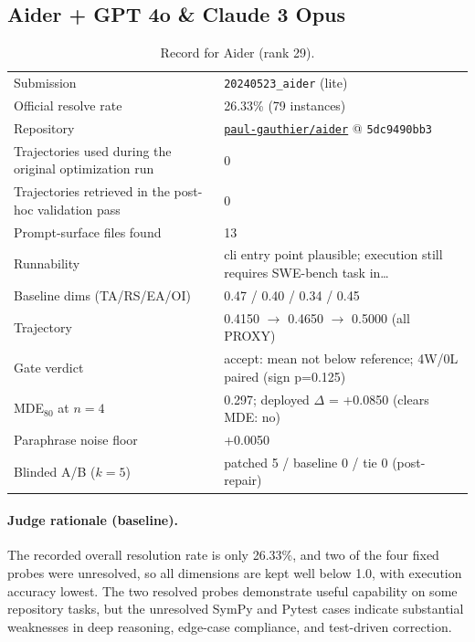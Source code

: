 \subsection{Aider + GPT 4o \& Claude 3 Opus}
\label{app:agent29}
\begin{table}[H]\centering\scriptsize
\caption{Record for Aider (rank 29).}
\begin{tabular}{lp{8.2cm}}\toprule
Submission & \texttt{20240523\_\allowbreak{}aider} (lite) \\
Official resolve rate & 26.33\% (79 instances) \\
Repository & \href{https://github.com/paul-gauthier/aider}{\texttt{paul-gauthier/aider}} @ \texttt{5dc9490bb3} \\
Trajectories used during the original optimization run & 0 \\
Trajectories retrieved in the post-hoc validation pass & 0 \\
Prompt-surface files found & 13 \\
Runnability & cli entry point plausible; execution still requires SWE-bench task in\ldots{} \\
Baseline dims (TA/RS/EA/OI) & 0.47 / 0.40 / 0.34 / 0.45 \\
Trajectory & 0.4150 $\to$ 0.4650 $\to$ 0.5000 (all PROXY) \\
Gate verdict & accept: mean not below reference; 4W/0L paired (sign p=0.125) \\
MDE$_{80}$ at $n{=}4$ & 0.297; deployed $\Delta$ = +0.0850 (clears MDE: no) \\
Paraphrase noise floor & +0.0050 \\
Blinded A/B ($k{=}5$) & patched 5 / baseline 0 / tie 0 (post-repair) \\
\bottomrule\end{tabular}\end{table}
\paragraph{Judge rationale (baseline).}
The recorded overall resolution rate is only 26.33\%, and two of the four fixed probes were unresolved, so all dimensions are kept well below 1.0, with execution accuracy lowest. The two resolved probes demonstrate useful capability on some repository tasks, but the unresolved SymPy and Pytest cases indicate substantial weaknesses in deep reasoning, edge-case compliance, and test-driven correction.
